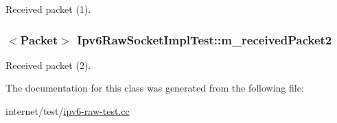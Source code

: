 Received packet (1). 

\subsubsection[{\texorpdfstring{m\+\_\+received\+Packet2}{m_receivedPacket2}}]{$<${\bf Packet}$>$ Ipv6\+Raw\+Socket\+Impl\+Test\+::m\+\_\+received\+Packet2\hspace{0.3cm}{\ttfamily [private]}}\hypertarget{classIpv6RawSocketImplTest_a1b23c24c9271e6874968546857829676}{}\label{classIpv6RawSocketImplTest_a1b23c24c9271e6874968546857829676}


Received packet (2). 



The documentation for this class was generated from the following file\+:\begin{DoxyCompactItemize}
\item 
internet/test/\hyperlink{ipv6-raw-test_8cc}{ipv6-\/raw-\/test.\+cc}\end{DoxyCompactItemize}
